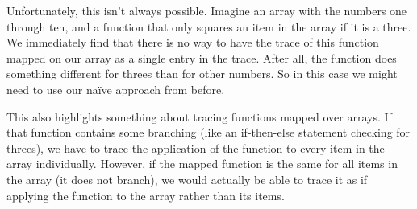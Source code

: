         Unfortunately, this isn't always possible.
        Imagine an array with the numbers one through ten, and a function that only squares an item in the array if it is a three.
        We immediately find that there is no way to have the trace of this function mapped on our array as a single entry in the trace.
        After all, the function does something different for threes than for other numbers.
        So in this case we might need to use our naïve approach from before.

        This also highlights something about tracing functions mapped over arrays.
        If that function contains some branching (like an if-then-else statement checking for threes), we have to trace the application of the function to every item in the array individually.
        However, if the mapped function is the same for all items in the array (it does not branch), we would actually be able to trace it as if applying the function to the array rather than its items.

